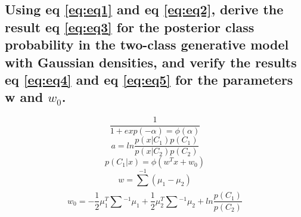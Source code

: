 \documentclass{article}
\begin{document}
	\subsection{Using eq \ref{eq:eq1} and eq \ref{eq:eq2}, derive the result eq \ref{eq:eq3} for the posterior class
		probability in the two-class generative model with Gaussian densities, and verify the
		results eq \ref{eq:eq4} and eq \ref{eq:eq5} for the parameters w and $w_{0}$.}
		\begin{equation}
			\label{eq:eq1}
			\frac{1}{1 + exp(-\alpha) = \phi(\alpha)}
		\end{equation}
		\begin{equation}
			\label{eq:eq2}
			a = ln\frac{p(x|C_{1})p(C_{1})}{p(x|C_{2})p(C_{2})}	
		\end{equation}
		\begin{equation}
			\label{eq:eq3}
			p(C_{1}|x) = \phi(w^{T}x + w_{0})
		\end{equation}
		\begin{equation}
			\label{eq:eq4}
			w = \sum_{}^{-1}(\mu_{1} - \mu_{2})
		\end{equation}
		\begin{equation}
			\label{eq:eq5}
				w_{0} = -\frac{1}{2}\mu^{T}_{1}\sum_{}^{}^{-1}\mu_{1} + \frac{1}{2}\mu_{2}^{T}\sum_{}^{}^{-1}\mu_{2} + ln\frac{p(C_{1})}{p(C_{2})}
		\end{equation}
		
\end{document}
